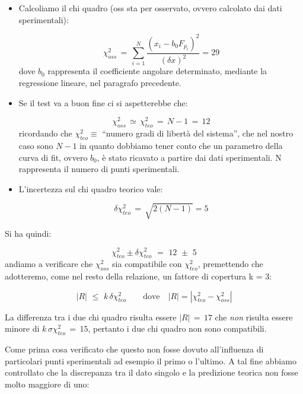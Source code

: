 \begin{itemize}
\item{Calcoliamo il chi quadro (oss sta per osservato, ovvero calcolato dai dati sperimentali):

	\begin{equation*}
        \chi_{oss}^2 \,=\, \sum_{i=1}^{N} \frac{(x_i - b_0 F_{p_i})^2}{(\delta x)^2} = 29
	\end{equation*}
	dove $b_0$ rappresenta il coefficiente angolare determinato, mediante la regressione lineare, nel paragrafo precedente.}
\item{Se il test va a buon fine ci si aspetterebbe che:

	\begin{equation*}
		\chi_{oss}^2 \, \simeq \, \chi_{teo}^2 \,=\, N - 1 \,=\, 12  
	\end{equation*}
	ricordando che $\chi_{teo}^2 \equiv$ ``numero gradi di libertà del sistema'', che nel nostro caso sono $N - 1$ in
    quanto dobbiamo tener conto che un parametro della curva di fit, ovvero $b_0$, è stato ricavato a partire dai dati
    sperimentali. N rappresenta il numero di punti sperimentali.}
\item{L'incertezza sul chi quadro teorico vale:

    \begin{equation*}
        \delta\chi_{teo}^2 \,=\, \sqrt{2(N - 1)} = 5  
	\end{equation*}

    }
\end{itemize}
%
Si ha quindi:

\begin{equation*}
	\chi_{teo}^2 \pm \delta\chi_{teo}^2 \,\,=\,\, 12 \,\,\pm\,\, 5
\end{equation*}
%
andiamo a verificare che $\chi_{oss}^2$ sia compatibile con $\chi_{teo}^2$, premettendo che adotteremo, come
nel resto della relazione, un fattore di copertura k = 3:

\begin{equation*}
	|R| \,\, \leq \,\, k \, \delta\chi_{teo}^2 \qquad \text{dove} \quad |R| = |\chi_{teo}^2 - \chi_{oss}^2|
\end{equation*}
%

La differenza tra i due chi quadro risulta essere $|R| \,=\, 17$ che \emph{non} risulta essere minore di
$k \, \sigma \chi_{teo}^2 \,=\, 15$, pertanto i due chi quadro non sono compatibili.

Come prima cosa verificato che questo non fosse dovuto all'influenza di particolari punti sperimentali ad esempio il primo o l'ultimo.
A tal fine abbiamo controllato che la discrepanza tra il dato singolo e la predizione teorica non fosse molto maggiore di uno:

